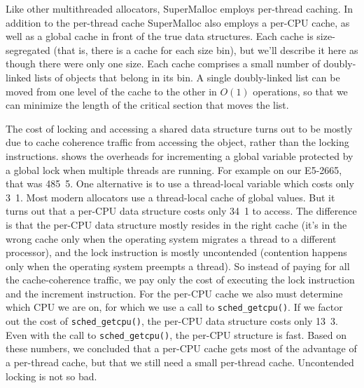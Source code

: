 \documentclass{sigplanconf}
\newcommand{\code}[1]{\texttt{#1}}
\begin{document}

Like other multithreaded allocators, SuperMalloc employs per-thread
caching.  In addition to the per-thread cache SuperMalloc also employs
a per-CPU cache, as well as a global cache in front of the true data
structures.  Each cache is size-segregated (that is, there is a cache
for each size bin), but we'll describe it here as though there were
only one size.  Each cache comprises a small number of doubly-linked
lists of objects that belong in its bin.  A single doubly-linked list
can be moved from one level of the cache to the other in $O(1)$
operations, so that we can minimize the length of the critical section
that moves the list.

The cost of locking and accessing a shared data structure turns out to
be mostly due to cache coherence traffic from accessing the object,
rather than the locking instructions.   shows the
overheads for incrementing a global variable protected by a global
lock when multiple threads are running.  For example on our E5-2665,
that was \unit{485.5}\nano\second.  One alternative is to use a
thread-local variable which costs only \unit{3.1}\nano\second.  Most
modern allocators use a thread-local cache of global values.  But it
turns out that a per-CPU data structure costs only
\unit{34.1}\nano\second{} to access.  The difference is that the
per-CPU data structure mostly resides in the right cache (it's in the
wrong cache only when the operating system migrates a thread to a
different processor), and the lock instruction is mostly uncontended
(contention happens only when the operating system preempts a thread).
So instead of paying for all the cache-coherence traffic, we pay only
the cost of executing the lock instruction and the increment
instruction.  For the per-CPU cache we also must determine which CPU
we are on, for which we use a call to \code{sched_getcpu()}.  If we
factor out the cost of \code{sched_getcpu()}, the per-CPU data
structure costs only \unit{13.3}\nano\second.  Even with the call to
\code{sched_getcpu()}, the per-CPU structure is fast. Based on these
numbers, we concluded that a per-CPU cache gets most of the advantage
of a per-thread cache, but that we still need a small per-thread
cache.  Uncontended locking is not so bad.
\end{document}
